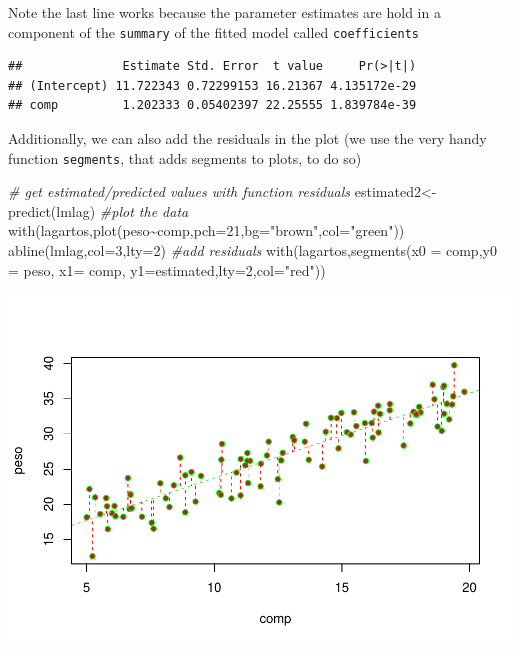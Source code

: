 \documentclass[
]{book}
\newenvironment{Shaded}{\begin{snugshade}}{\end{snugshade}}
\newcommand{\AttributeTok}[1]{\textcolor[rgb]{0.77,0.63,0.00}{#1}}
\newcommand{\CommentTok}[1]{\textcolor[rgb]{0.56,0.35,0.01}{\textit{#1}}}
\newcommand{\DecValTok}[1]{\textcolor[rgb]{0.00,0.00,0.81}{#1}}
\newcommand{\FunctionTok}[1]{\textcolor[rgb]{0.00,0.00,0.00}{#1}}
\newcommand{\NormalTok}[1]{#1}
\newcommand{\OtherTok}[1]{\textcolor[rgb]{0.56,0.35,0.01}{#1}}
\newcommand{\SpecialCharTok}[1]{\textcolor[rgb]{0.00,0.00,0.00}{#1}}
\newcommand{\StringTok}[1]{\textcolor[rgb]{0.31,0.60,0.02}{#1}}
\begin{document}
Note the last line works because the parameter estimates are hold in a component of the \texttt{summary} of the fitted model called \texttt{coefficients}

\begin{Shaded}
\end{Shaded}

\begin{verbatim}
##              Estimate Std. Error  t value     Pr(>|t|)
## (Intercept) 11.722343 0.72299153 16.21367 4.135172e-29
## comp         1.202333 0.05402397 22.25555 1.839784e-39
\end{verbatim}

Additionally, we can also add the residuals in the plot (we use the very handy function \texttt{segments}, that adds segments to plots, to do so)

\begin{Shaded}
\begin{Highlighting}[]
\CommentTok{\# get estimated/predicted values with function residuals}
\NormalTok{estimated2}\OtherTok{\textless{}{-}}\FunctionTok{predict}\NormalTok{(lmlag)}
\CommentTok{\#plot the data}
\FunctionTok{with}\NormalTok{(lagartos,}\FunctionTok{plot}\NormalTok{(peso}\SpecialCharTok{\textasciitilde{}}\NormalTok{comp,}\AttributeTok{pch=}\DecValTok{21}\NormalTok{,}\AttributeTok{bg=}\StringTok{"brown"}\NormalTok{,}\AttributeTok{col=}\StringTok{"green"}\NormalTok{))}
\FunctionTok{abline}\NormalTok{(lmlag,}\AttributeTok{col=}\DecValTok{3}\NormalTok{,}\AttributeTok{lty=}\DecValTok{2}\NormalTok{)}
\CommentTok{\#add residuals}
\FunctionTok{with}\NormalTok{(lagartos,}\FunctionTok{segments}\NormalTok{(}\AttributeTok{x0 =}\NormalTok{ comp,}\AttributeTok{y0 =}\NormalTok{ peso, }\AttributeTok{x1=}\NormalTok{ comp, }\AttributeTok{y1=}\NormalTok{estimated,}\AttributeTok{lty=}\DecValTok{2}\NormalTok{,}\AttributeTok{col=}\StringTok{"red"}\NormalTok{))}
\end{Highlighting}
\end{Shaded}

\includegraphics{ECOMODbook_files/figure-latex/a6.11-1.pdf}
\end{document}
